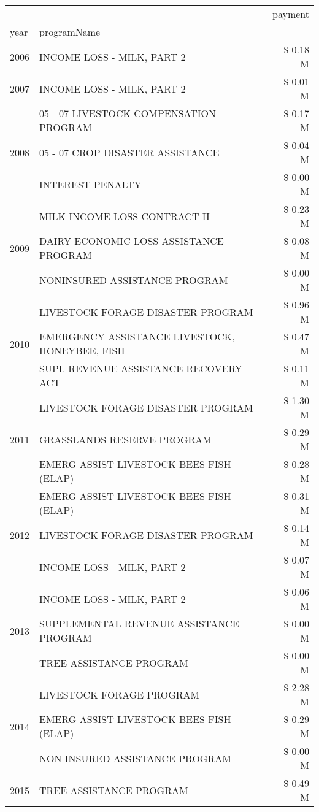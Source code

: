 \begin{tabular}{llr}
\toprule
 &  & payment \\
year & programName &  \\
\midrule
2006 & INCOME LOSS - MILK, PART 2 & \$ 0.18 M \\
\cline{1-3}
2007 & INCOME LOSS - MILK, PART 2 & \$ 0.01 M \\
\cline{1-3}
\multirow[t]{3}{*}{2008} & 05 - 07 LIVESTOCK COMPENSATION PROGRAM & \$ 0.17 M \\
 & 05 - 07 CROP DISASTER ASSISTANCE & \$ 0.04 M \\
 & INTEREST PENALTY & \$ 0.00 M \\
\cline{1-3}
\multirow[t]{3}{*}{2009} & MILK INCOME LOSS CONTRACT II & \$ 0.23 M \\
 & DAIRY ECONOMIC LOSS ASSISTANCE PROGRAM & \$ 0.08 M \\
 & NONINSURED ASSISTANCE PROGRAM & \$ 0.00 M \\
\cline{1-3}
\multirow[t]{3}{*}{2010} & LIVESTOCK FORAGE DISASTER  PROGRAM & \$ 0.96 M \\
 & EMERGENCY ASSISTANCE LIVESTOCK, HONEYBEE, FISH & \$ 0.47 M \\
 & SUPL REVENUE ASSISTANCE RECOVERY ACT & \$ 0.11 M \\
\cline{1-3}
\multirow[t]{3}{*}{2011} & LIVESTOCK FORAGE DISASTER PROGRAM & \$ 1.30 M \\
 & GRASSLANDS RESERVE PROGRAM & \$ 0.29 M \\
 & EMERG ASSIST LIVESTOCK BEES FISH (ELAP) & \$ 0.28 M \\
\cline{1-3}
\multirow[t]{3}{*}{2012} & EMERG ASSIST LIVESTOCK BEES FISH (ELAP) & \$ 0.31 M \\
 & LIVESTOCK FORAGE DISASTER PROGRAM & \$ 0.14 M \\
 & INCOME LOSS - MILK, PART 2 & \$ 0.07 M \\
\cline{1-3}
\multirow[t]{3}{*}{2013} & INCOME LOSS - MILK, PART 2 & \$ 0.06 M \\
 & SUPPLEMENTAL REVENUE ASSISTANCE PROGRAM & \$ 0.00 M \\
 & TREE ASSISTANCE PROGRAM & \$ 0.00 M \\
\cline{1-3}
\multirow[t]{3}{*}{2014} & LIVESTOCK FORAGE PROGRAM & \$ 2.28 M \\
 & EMERG ASSIST LIVESTOCK BEES FISH (ELAP) & \$ 0.29 M \\
 & NON-INSURED ASSISTANCE PROGRAM & \$ 0.00 M \\
\cline{1-3}
\multirow[t]{3}{*}{2015} & TREE ASSISTANCE PROGRAM & \$ 0.49 M \\

\end{tabular}
